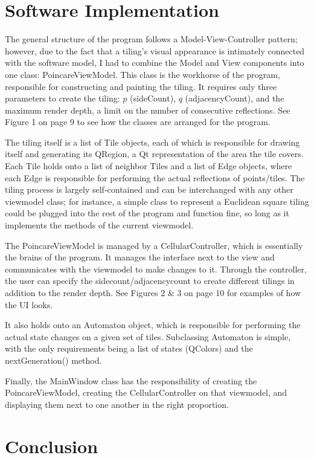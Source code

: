 \documentclass[letterpaper,12pt]{article}
\begin{document}
\section*{Software Implementation}

The general structure of the program follows a Model-View-Controller pattern; however, due to the fact that a tiling's visual appearance is intimately connected with the software model, I had to combine the Model and View components into one class: PoincareViewModel. This class is the workhorse of the program, responsible for constructing and painting the tiling. It requires only three parameters to create the tiling: $p$ (sideCount), $q$ (adjacencyCount), and the maximum render depth, a limit on the number of consecutive reflections. See Figure 1 on page 9 to see how the classes are arranged for the program.

The tiling itself is a list of Tile objects, each of which is responsible for drawing itself and generating its QRegion, a Qt representation of the area the tile covers. Each Tile holds onto a list of neighbor Tiles and a list of Edge objects, where each Edge is responsible for performing the actual reflections of points/tiles. The tiling process is largely self-contained and can be interchanged with any other viewmodel class; for instance, a simple class to represent a Euclidean square tiling could be plugged into the rest of the program and function fine, so long as it implements the methods of the current viewmodel.

The PoincareViewModel is managed by a CellularController, which is essentially the brains of the program. It manages the interface next to the view and communicates with the viewmodel to make changes to it. Through the controller, the user can specify the sidecount/adjacencycount to create different tilings in addition to the render depth. See Figures 2 \& 3 on page 10 for examples of how the UI looks.

It also holds onto an Automaton object, which is responsible for performing the actual state changes on a given set of tiles. Subclassing Automaton is simple, with the only requirements being a list of states (QColors) and the nextGeneration() method. 

Finally, the MainWindow class has the responsibility of creating the PoincareViewModel, creating the CellularController on that viewmodel, and displaying them next to one another in the right proportion.

\section*{Conclusion}
\end{document}
